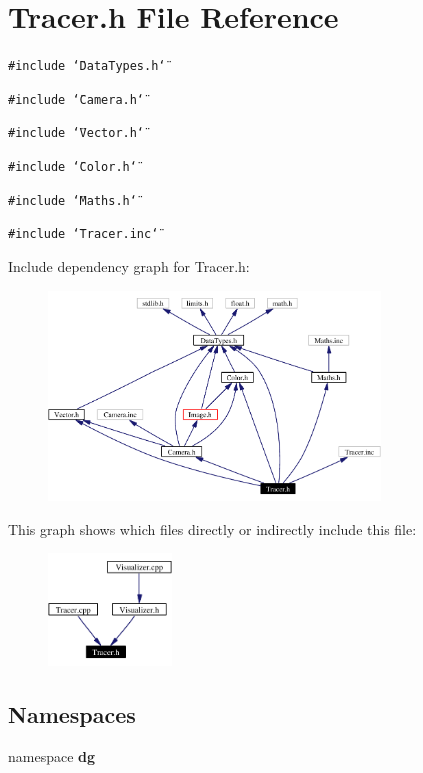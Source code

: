 \section{Tracer.h File Reference}
\label{Tracer_8h}
{\tt \#include \char`\"{}Data\-Types.h\char`\"{}}\par
{\tt \#include \char`\"{}Camera.h\char`\"{}}\par
{\tt \#include \char`\"{}Vector.h\char`\"{}}\par
{\tt \#include \char`\"{}Color.h\char`\"{}}\par
{\tt \#include \char`\"{}Maths.h\char`\"{}}\par
{\tt \#include \char`\"{}Tracer.inc\char`\"{}}\par


Include dependency graph for Tracer.h:\begin{figure}[H]
\begin{center}
\leavevmode
\includegraphics[width=250pt]{Tracer_8h__incl}
\end{center}
\end{figure}


This graph shows which files directly or indirectly include this file:\begin{figure}[H]
\begin{center}
\leavevmode
\includegraphics[width=93pt]{Tracer_8h__dep__incl}
\end{center}
\end{figure}
\subsection*{Namespaces}
\begin{CompactItemize}
\item 
namespace {\bf dg}
\end{CompactItemize}
